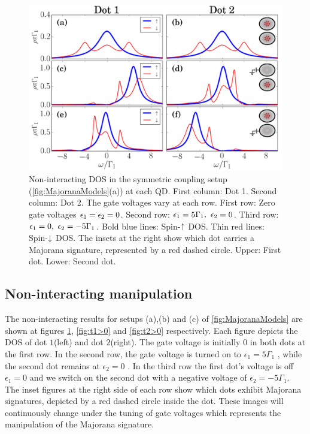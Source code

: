 \begin{figure}[H]
    \begin{center}
    \includegraphics[scale=0.36]{IMAGES/GreenResults/t1=t2.png}
    \caption{ \label{fig:t1=t2}  Non-interacting DOS in the symmetric coupling setup (\ref{fig:MajoranaModels}(a)) at each QD. First column: Dot 1. Second column: Dot 2. The gate voltages vary at each row.  First row: Zero gate voltages $\epsilon_1=\epsilon_2=0$. Second row: $\epsilon_1=5\Gamma_1, \ \epsilon_2 =0$.  Third row: $\epsilon_1=0, \ \epsilon_2 =-5\Gamma_1$.  Bold blue lines: Spin-$\uparrow$ DOS. Thin red lines: Spin-$\downarrow$ DOS. The insets at the right show which dot carries a Majorana signature, represented by a red dashed circle. Upper: First dot. Lower: Second dot. \protect{}
    }
    \end{center}
\end{figure}

\subsection{Non-interacting manipulation}

 The non-interacting results for setups (a),(b) and (c) of \ref{fig:MajoranaModels} are shown at figures \ref{fig:t1=t2}, \ref{fig:t1>0} and \ref{fig:t2>0} respectively. Each figure depicts the DOS of dot $1$(left) and dot $2$(right). The gate voltage is initially $0$ in both dots at the first row. In the second row, the gate voltage is turned on to  $\epsilon_1 = 5\Gamma_1$ , while the second dot remains at $\epsilon_2 = 0$ . In the third row the first dot's voltage is off $\epsilon_1=0$ and we switch on the second dot with a negative voltage of $\epsilon_2 = -5\Gamma_1$. The inset figures at the right side of each row show which dots exhibit Majorana signatures, depicted by a red dashed circle inside the dot. These images will continuously change under the tuning of gate voltages which represents the manipulation of the Majorana signature.



